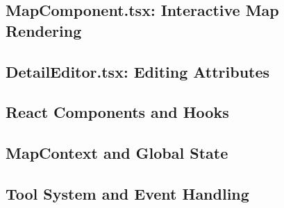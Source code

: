 \subsection{MapComponent.tsx: Interactive Map Rendering}


\subsection{DetailEditor.tsx: Editing Attributes}



\subsection{React Components and Hooks}

\subsection{MapContext and Global State}

\subsection{Tool System and Event Handling}

